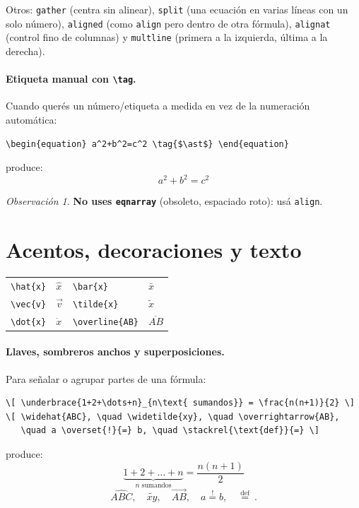 \documentclass[11pt,a4paper]{article}
\newcommand{\C}[1]{\texttt{\textbackslash #1}}   %
\theoremstyle{plain}      %
\theoremstyle{definition} %
\theoremstyle{remark}
\newtheorem*{obs}{Observación}
\begin{document}
Otros: \texttt{gather} (centra sin alinear), \texttt{split} (una ecuación en
varias líneas con un solo número), \texttt{aligned} (como \texttt{align} pero
dentro de otra fórmula), \texttt{alignat} (control fino de columnas) y
\texttt{multline} (primera a la izquierda, última a la derecha).

\paragraph{Etiqueta manual con \C{tag}.} Cuando querés un número/etiqueta a
medida en vez de la numeración automática:
\begin{lstlisting}
\begin{equation} a^2+b^2=c^2 \tag{$\ast$} \end{equation}
\end{lstlisting}
produce:
\begin{equation} a^2+b^2=c^2 \tag{$\ast$} \end{equation}

\begin{obs}
\textbf{No uses \texttt{eqnarray}} (obsoleto, espaciado roto): usá
\texttt{align}.
\end{obs}

\section{Acentos, decoraciones y texto}
\begin{center}
\begin{tabular}{llll}
\toprule
\C{hat\{x\}} & $\hat{x}$ & \C{bar\{x\}} & $\bar{x}$ \\
\C{vec\{v\}} & $\vec{v}$ & \C{tilde\{x\}} & $\tilde{x}$ \\
\C{dot\{x\}} & $\dot{x}$ & \C{overline\{AB\}} & $\overline{AB}$ \\
\bottomrule
\end{tabular}
\end{center}
\paragraph{Llaves, sombreros anchos y superposiciones.} Para señalar o agrupar
partes de una fórmula:
\begin{lstlisting}
\[ \underbrace{1+2+\dots+n}_{n\text{ sumandos}} = \frac{n(n+1)}{2} \]
\[ \widehat{ABC}, \quad \widetilde{xy}, \quad \overrightarrow{AB},
   \quad a \overset{!}{=} b, \quad \stackrel{\text{def}}{=} \]
\end{lstlisting}
produce:
\[ \underbrace{1+2+\dots+n}_{n\text{ sumandos}} = \frac{n(n+1)}{2} \]
\[ \widehat{ABC}, \quad \widetilde{xy}, \quad \overrightarrow{AB},
   \quad a \overset{!}{=} b, \quad \stackrel{\text{def}}{=}\ . \]
\end{document}
